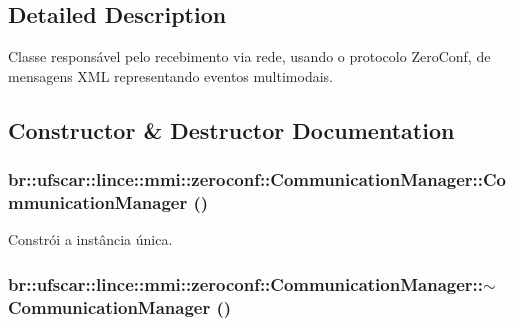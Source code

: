 \subsection{Detailed Description}
Classe responsável pelo recebimento via rede, usando o protocolo ZeroConf, de mensagens XML representando eventos multimodais. 

\subsection{Constructor \& Destructor Documentation}
\hypertarget{classbr_1_1ufscar_1_1lince_1_1mmi_1_1zeroconf_1_1CommunicationManager_a4bb343041bd8a27f7640a3a0405459f7}{
\subsubsection[{CommunicationManager}]{\setlength{\rightskip}{0pt plus 5cm}br::ufscar::lince::mmi::zeroconf::CommunicationManager::CommunicationManager ()}}
\label{classbr_1_1ufscar_1_1lince_1_1mmi_1_1zeroconf_1_1CommunicationManager_a4bb343041bd8a27f7640a3a0405459f7}


Constrói a instância única. 

\hypertarget{classbr_1_1ufscar_1_1lince_1_1mmi_1_1zeroconf_1_1CommunicationManager_adc5185400454d122aa325f2e79017eba}{
\subsubsection[{$\sim$CommunicationManager}]{\setlength{\rightskip}{0pt plus 5cm}br::ufscar::lince::mmi::zeroconf::CommunicationManager::$\sim$CommunicationManager ()}}
\label{classbr_1_1ufscar_1_1lince_1_1mmi_1_1zeroconf_1_1CommunicationManager_adc5185400454d122aa325f2e79017eba}


